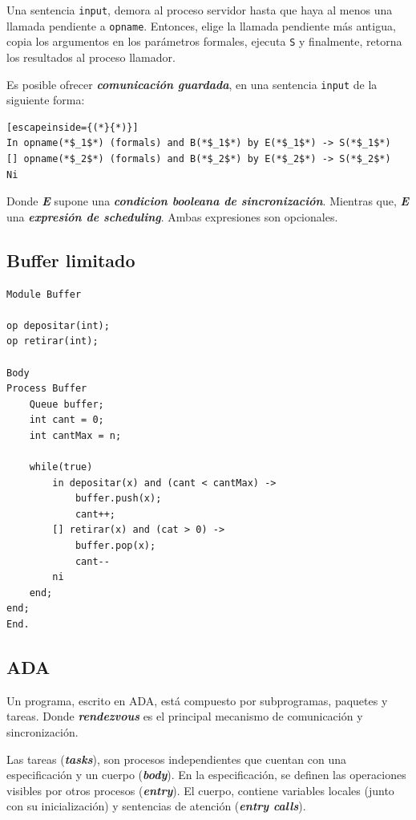 \documentclass[a4paper, 10pt]{report}
\begin{document}
Una sentencia \lstinline{input}, demora al proceso servidor hasta que haya al menos una llamada pendiente a \lstinline{opname}. Entonces, elige la llamada pendiente más antigua, copia los argumentos en los parámetros formales, ejecuta \lstinline{S} y finalmente, retorna los resultados al proceso llamador.

Es posible ofrecer \textbf{\emph{comunicación guardada}}, en una sentencia \lstinline{input} de la siguiente forma:


\begin{lstlisting}[escapeinside={(*}{*)}]
In opname(*$_1$*) (formals) and B(*$_1$*) by E(*$_1$*) -> S(*$_1$*)
[] opname(*$_2$*) (formals) and B(*$_2$*) by E(*$_2$*) -> S(*$_2$*)
Ni
\end{lstlisting}

Donde \textbf{\emph{E}} supone una \textbf{\emph{condicion booleana de sincronización}}. Mientras que, \textbf{\emph{E}} una \textbf{\emph{expresión de scheduling}}. Ambas expresiones son opcionales.

\subsection{Buffer limitado}

\begin{lstlisting}
Module Buffer

op depositar(int);
op retirar(int);

Body
Process Buffer
    Queue buffer;
    int cant = 0;
    int cantMax = n;

    while(true)
        in depositar(x) and (cant < cantMax) ->
            buffer.push(x);
            cant++;
        [] retirar(x) and (cat > 0) ->
            buffer.pop(x);
            cant--
        ni
    end;
end;
End.
\end{lstlisting}

\subsection{ADA}

Un programa, escrito en ADA, está compuesto por subprogramas, paquetes y tareas. Donde \textbf{\emph{rendezvous}} es el principal mecanismo de comunicación y sincronización.

Las tareas (\textbf{\emph{tasks}}), son procesos independientes que cuentan con una especificación y un cuerpo (\textbf{\emph{body}}). En la especificación, se definen las operaciones visibles por otros procesos (\textbf{\emph{entry}}). El cuerpo, contiene variables locales (junto con su inicialización) y sentencias de atención (\textbf{\emph{entry calls}}).
\end{document}
